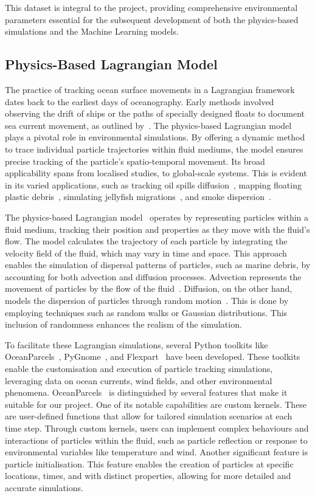 This dataset is integral to the project, providing comprehensive environmental parameters essential for the subsequent development of both the physics-based simulations and the Machine Learning models.

\subsection{Physics-Based Lagrangian Model}
\label{subsec:2.1.3}
The practice of tracking ocean surface movements in a Lagrangian framework dates back to the earliest days of oceanography. Early methods involved observing the drift of ships or the paths of specially designed floats to document sea current movement, as outlined by~\cite{14}. The physics-based Lagrangian model~\cite{1} plays a pivotal role in environmental simulations. By offering a dynamic method to trace individual particle trajectories within fluid mediums, the model ensures precise tracking of the particle’s spatio-temporal movement. Its broad applicability spans from localised studies, to global-scale systems. This is evident in its varied applications, such as tracking oil spills diffusion~\cite{15}, mapping floating plastic debris~\cite{16}, simulating jellyfish migrations~\cite{17}, and smoke dispersion~\cite{18}.

The physics-based Lagrangian model~\cite{1} operates by representing particles within a fluid medium, tracking their position and properties as they move with the fluid’s flow. The model calculates the trajectory of each particle by integrating the velocity field of the fluid, which may vary in time and space. This approach enables the simulation of dispersal patterns of particles, such as marine debris, by accounting for both advection and diffusion processes. Advection represents the movement of particles by the flow of the fluid~\cite{19}. Diffusion, on the other hand, models the dispersion of particles through random motion~\cite{19}. This is done by employing techniques such as random walks or Gaussian distributions. This inclusion of randomness enhances the realism of the simulation.

To facilitate these Lagrangian simulations, several Python toolkits like OceanParcels~\cite{20}, PyGnome~\cite{21}, and Flexpart~\cite{22} have been developed. These toolkits enable the customisation and execution of particle tracking simulations, leveraging data on ocean currents, wind fields, and other environmental phenomena. OceanParcels~\cite{20} is distinguished by several features that make it suitable for our project. One of its notable capabilities are custom kernels. These are user-defined functions that allow for tailored simulation scenarios at each time step. Through custom kernels, users can implement complex behaviours and interactions of particles within the fluid, such as particle reflection or response to environmental variables like temperature and wind. Another significant feature is particle initialisation. This feature enables the creation of particles at specific locations, times, and with distinct properties, allowing for more detailed and accurate simulations. 

